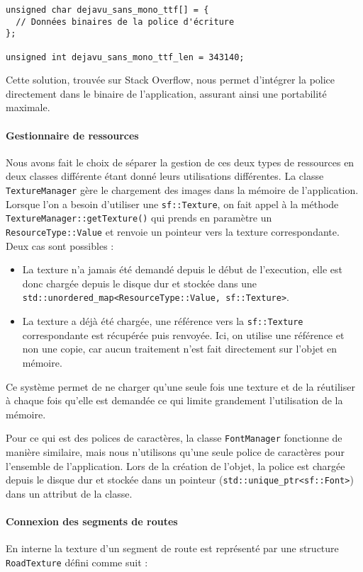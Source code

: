 \begin{itemize}
\begin{lstlisting}[style=CStyle,label={lst:example_generated_from_xxd_i}]
unsigned char dejavu_sans_mono_ttf[] = {
  // Données binaires de la police d'écriture
};

unsigned int dejavu_sans_mono_ttf_len = 343140;
\end{lstlisting}
Cette solution, trouvée sur Stack Overflow\cite{stackoverflow_embed_font}, nous permet d'intégrer la police directement dans le binaire de l'application, assurant ainsi une portabilité maximale.

\paragraph{Gestionnaire de ressources}
Nous avons fait le choix de séparer la gestion de ces deux types de ressources en deux classes différente étant donné leurs utilisations différentes.
La classe \texttt{TextureManager} gère le chargement des images dans la mémoire de l'application.
Lorsque l'on a besoin d'utiliser une \texttt{sf::Texture}, on fait appel à la méthode \texttt{TextureManager::getTexture()} qui prends en paramètre un \texttt{ResourceType::Value} et renvoie un pointeur vers la texture correspondante.
Deux cas sont possibles :
\begin{itemize}
    \item La texture n'a jamais été demandé depuis le début de l'execution, elle est donc chargée depuis le disque dur et stockée dans une \texttt{std::unordered\_map<ResourceType::Value, sf::Texture>}.
    \item La texture a déjà été chargée, une référence vers la \texttt{sf::Texture} correspondante est récupérée puis renvoyée.
    Ici, on utilise une référence et non une copie, car aucun traitement n'est fait directement sur l'objet en mémoire.
\end{itemize}
Ce système permet de ne charger qu'une seule fois une texture et de la réutiliser à chaque fois qu'elle est demandée ce qui limite grandement l'utilisation de la mémoire.

Pour ce qui est des polices de caractères, la classe \texttt{FontManager} fonctionne de manière similaire, mais nous n'utilisons qu'une seule police de caractères pour l'ensemble de l'application.
Lors de la création de l'objet, la police est chargée depuis le disque dur et stockée dans un pointeur (\texttt{std::unique\_ptr<sf::Font>}) dans un attribut de la classe.


\paragraph{Connexion des segments de routes}
En interne la texture d'un segment de route est représenté par une structure \texttt{RoadTexture} défini comme suit :


\end{itemize}
